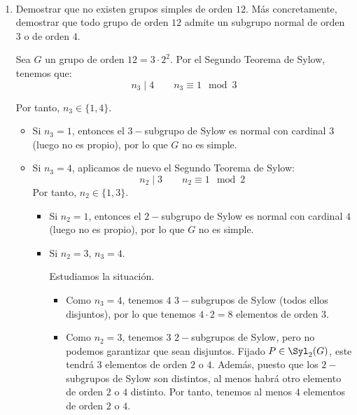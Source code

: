 \begin{ejercicio}\label{ej:6.24}~
    \begin{enumerate}
        \item Demostrar que no existen grupos simples de orden $12$. Más concretamente, demostrar que todo grupo de orden $12$ admite un subgrupo normal de orden $3$ o de orden $4$.
        
        Sea $G$ un grupo de orden $12=3\cdot 2^2$. Por el Segundo Teorema de Sylow, tenemos que:
        \begin{equation*}
            n_3 \mid 4 \qquad n_3 \equiv 1 \mod 3
        \end{equation*}

        Por tanto, $n_3\in \{1,4\}$.
        \begin{itemize}
            \item Si $n_3=1$, entonces el $3-$subgrupo de Sylow es normal con cardinal $3$ (luego no es propio), por lo que $G$ no es simple.
            
            \item Si $n_3=4$, aplicamos de nuevo el Segundo Teorema de Sylow:
            \begin{equation*}
                n_2 \mid 3 \qquad n_2 \equiv 1 \mod 2
            \end{equation*}
            Por tanto, $n_2\in \{1,3\}$.
            \begin{itemize}
                \item Si $n_2=1$, entonces el $2-$subgrupo de Sylow es normal con cardinal $4$ (luego no es propio), por lo que $G$ no es simple.
                \item Si $n_2=3$, $n_3=4$.

                Estudiamos la situación.
                \begin{itemize}
                    \item Como $n_3=4$, tenemos $4$ $3-$subgrupos de Sylow (todos ellos disjuntos), por lo que tenemos $4\cdot 2=8$ elementos de orden $3$.
                    \item Como $n_2=3$, tenemos $3$ $2-$subgrupos de Sylow, pero no podemos garantizar que sean disjuntos. Fijado $P\in \Syl_2(G)$, este tendrá $3$ elementos de orden $2$ o $4$. Además, puesto que los $2-$subgrupos de Sylow son distintos, al menos habrá otro elemento de orden $2$ o $4$ distinto. Por tanto, tenemos al menos $4$ elementos de orden $2$ o $4$.
                \end{itemize}
                

\end{itemize}
\end{itemize}
\end{enumerate}
\end{ejercicio}
